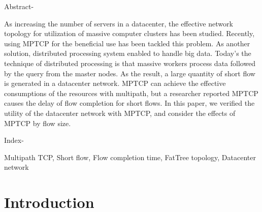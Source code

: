 \documentclass[10pt, a4paper, twocolumn]{jsarticle}
\begin{document}
\begin{spacing}{0.7}
\begin{bfseries}
\begin{itshape}
Abstract-
\end{itshape}
As increasing the number of servers in a datacenter, the effective network
topology for utilization of massive computer clusters has been studied.
Recently, using MPTCP for the beneficial use has been tackled this problem.
As another solution, distributed processing system enabled to handle big data.
Today's the technique of distributed processing is that massive workers process data followed by the query from the master nodes.
As the result, a large quantity of short flow is generated in a datacenter network.
MPTCP can achieve the effective consumptions of the resources with multipath,
but a researcher reported MPTCP causes the delay of flow completion for short flows.
In this paper, we verified the utility of the datacenter network with MPTCP, and consider the effects of MPTCP by flow size.

\vspace{0.5cm}
\begin{itshape}
Index-
\end{itshape}
Multipath TCP, Short flow, Flow completion time, FatTree topology, Datacenter
network\end{bfseries}
\end{spacing}
\vspace{0.5cm}
\section{Introduction}
\label{sec:intro}
\end{document}
